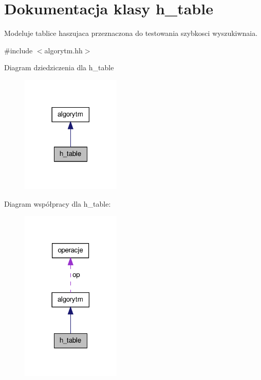\hypertarget{classh__table}{\section{\-Dokumentacja klasy h\-\_\-table}
\label{classh__table}
}


\-Modeluje tablice haszujaca przeznaczona do testowania szybkosci wyszukiwnaia.  




{\ttfamily \#include $<$algorytm.\-hh$>$}



\-Diagram dziedziczenia dla h\-\_\-table\nopagebreak
\begin{figure}[H]
\begin{center}
\leavevmode
\includegraphics[width=134pt]{classh__table__inherit__graph}
\end{center}
\end{figure}


\-Diagram współpracy dla h\-\_\-table\-:\nopagebreak
\begin{figure}[H]
\begin{center}
\leavevmode
\includegraphics[width=134pt]{classh__table__coll__graph}
\end{center}
\end{figure}
